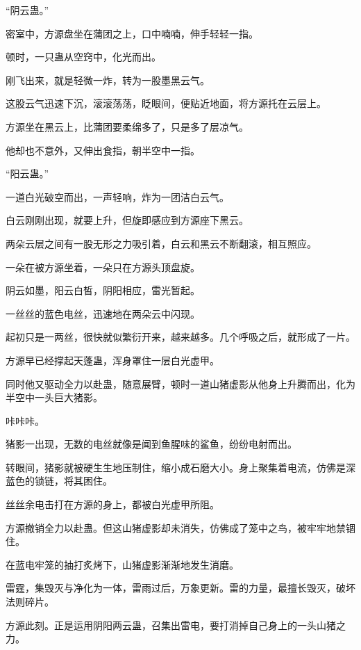 
\begin{this_body}



“阴云蛊。”

密室中，方源盘坐在蒲团之上，口中喃喃，伸手轻轻一指。

顿时，一只蛊从空窍中，化光而出。

刚飞出来，就是轻微一炸，转为一股墨黑云气。

这股云气迅速下沉，滚滚荡荡，眨眼间，便贴近地面，将方源托在云层上。

方源坐在黑云上，比蒲团要柔绵多了，只是多了层凉气。

他却也不意外，又伸出食指，朝半空中一指。

“阳云蛊。”

一道白光破空而出，一声轻响，炸为一团洁白云气。

白云刚刚出现，就要上升，但旋即感应到方源座下黑云。

两朵云层之间有一股无形之力吸引着，白云和黑云不断翻滚，相互照应。

一朵在被方源坐着，一朵只在方源头顶盘旋。

阴云如墨，阳云白皙，阴阳相应，雷光暂起。

一丝丝的蓝色电丝，迅速地在两朵云中闪现。

起初只是一两丝，很快就似繁衍开来，越来越多。几个呼吸之后，就形成了一片。

方源早已经撑起天蓬蛊，浑身罩住一层白光虚甲。

同时他又驱动全力以赴蛊，随意展臂，顿时一道山猪虚影从他身上升腾而出，化为半空中一头巨大猪影。

咔咔咔。

猪影一出现，无数的电丝就像是闻到鱼腥味的鲨鱼，纷纷电射而出。

转眼间，猪影就被硬生生地压制住，缩小成石磨大小。身上聚集着电流，仿佛是深蓝色的锁链，将其困住。

丝丝余电击打在方源的身上，都被白光虚甲所阻。

方源撤销全力以赴蛊。但这山猪虚影却未消失，仿佛成了笼中之鸟，被牢牢地禁锢住。

在蓝电牢笼的抽打炙烤下，山猪虚影渐渐地发生消磨。

雷霆，集毁灭与净化为一体，雷雨过后，万象更新。雷的力量，最擅长毁灭，破坏法则碎片。

方源此刻。正是运用阴阳两云蛊，召集出雷电，要打消掉自己身上的一头山猪之力。


\end{this_body}
